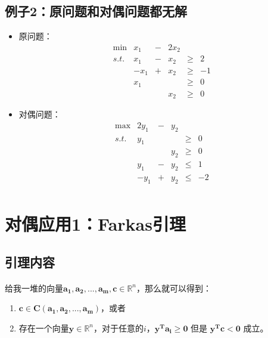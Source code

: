 	\subsection{例子2：原问题和对偶问题都无解}
		\begin{itemize}
			\item 原问题：
				\[
				\begin{array}{rrrrrrl}
 					\min &   x_1 & - & 2x_2 & \\
 					s.t. &   x_1 & - & x_2 & \geq & 2   \\
      					 & - x_1 & + & x_2 & \geq & -1   \\
      					 &   x_1 &   &         & \geq & 0   \\
            			 &      &  & x_2 & \geq & 0   
					\end{array} \nonumber
				\]
			\item 对偶问题：
				\[
				\begin{array}{rrrrrrl}
 					\max & 2y_1 & - & y_2 & \\
 					s.t. &   y_1 & &         &       \geq & 0   \\
      					 &   &       &    y_2     & \geq & 0   \\
     				     &   y_1 & - & y_2  & \leq & 1   \\
      					 &   -y_1 &+ & y_2 & \leq & -2   \\
				\end{array} \nonumber
				\]
		\end{itemize}
	\section{对偶应用1：Farkas引理}
		\subsection{引理内容}
			\paragraph{}给我一堆的向量$\mathbf{a_1, a_{2}, ..., a_{m}, c} \in \mathbb{R}^n$，那么就可以得到：
			\begin{enumerate}
				\item $\mathbf{c} \in \mathbf{C(a_{1}, a_{2},..., a_{m})}$，或者
				\item 存在一个向量$\mathbf{y}\in \mathbb{R}^{n}$，对于任意的$i$，$\mathbf{y^T a_i \geq 0}$ 但是 $\mathbf{ y^T c < 0}$ 成立。
			\end{enumerate}
